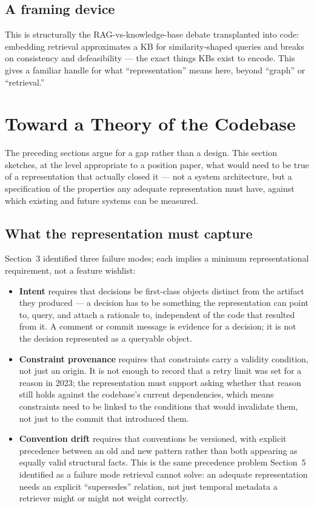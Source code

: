 \documentclass[11pt]{article}
\begin{document}
\subsection{A framing device}

This is structurally the RAG-vs-knowledge-base debate transplanted into code: embedding retrieval approximates a KB for similarity-shaped queries and breaks on consistency and defeasibility --- the exact things KBs exist to encode. This gives a familiar handle for what ``representation'' means here, beyond ``graph'' or ``retrieval.''

\section{Toward a Theory of the Codebase}

The preceding sections argue for a gap rather than a design. This section sketches, at the level appropriate to a position paper, what would need to be true of a representation that actually closed it --- not a system architecture, but a specification of the properties any adequate representation must have, against which existing and future systems can be measured.

\subsection{What the representation must capture}

Section~3 identified three failure modes; each implies a minimum representational requirement, not a feature wishlist:

\begin{itemize}[leftmargin=*]
  \item \textbf{Intent} requires that decisions be first-class objects distinct from the artifact they produced --- a decision has to be something the representation can point to, query, and attach a rationale to, independent of the code that resulted from it. A comment or commit message is evidence for a decision; it is not the decision represented as a queryable object.
  \item \textbf{Constraint provenance} requires that constraints carry a validity condition, not just an origin. It is not enough to record that a retry limit was set for a reason in 2023; the representation must support asking whether that reason still holds against the codebase's current dependencies, which means constraints need to be linked to the conditions that would invalidate them, not just to the commit that introduced them.
  \item \textbf{Convention drift} requires that conventions be versioned, with explicit precedence between an old and new pattern rather than both appearing as equally valid structural facts. This is the same precedence problem Section~5 identified as a failure mode retrieval cannot solve: an adequate representation needs an explicit ``supersedes'' relation, not just temporal metadata a retriever might or might not weight correctly.
\end{itemize}
\end{document}
